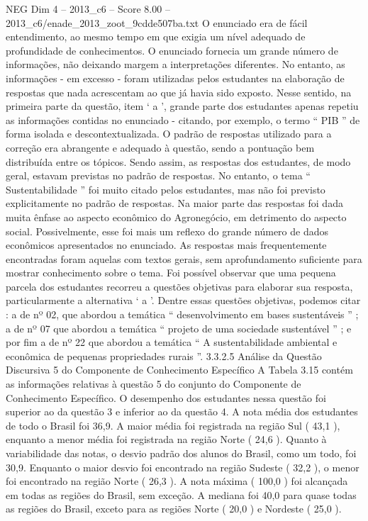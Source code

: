 \begin{textsample}{NEG Dim 4 – 2013\_c6 – Score 8.00 – 2013\_c6/enade\_2013\_zoot\_9cdde507ba.txt}
O enunciado era de fácil entendimento, ao mesmo tempo em que exigia um nível adequado de profundidade de conhecimentos.
O enunciado fornecia um grande número de informações, não deixando margem a interpretações diferentes.
No entanto, as informações - em excesso - foram utilizadas pelos estudantes na elaboração de respostas que nada acrescentam ao que já havia sido exposto.
Nesse sentido, na primeira parte da questão, item ‘ a ’, grande parte dos estudantes apenas repetiu as informações contidas no enunciado - citando, por exemplo, o termo “ PIB ” de forma isolada e descontextualizada.
O padrão de respostas utilizado para a correção era abrangente e adequado à questão, sendo a pontuação bem distribuída entre os tópicos.
Sendo assim, as respostas dos estudantes, de modo geral, estavam previstas no padrão de respostas.
No entanto, o tema “ Sustentabilidade ” foi muito citado pelos estudantes, mas não foi previsto explicitamente no padrão de respostas.
Na maior parte das respostas foi dada muita ênfase ao aspecto econômico do Agronegócio, em detrimento do aspecto social.
Possivelmente, esse foi mais um reflexo do grande número de dados econômicos apresentados no enunciado.
As respostas mais frequentemente encontradas foram aquelas com textos gerais, sem aprofundamento suficiente para mostrar conhecimento sobre o tema.
Foi possível observar que uma pequena parcela dos estudantes recorreu a questões objetivas para elaborar sua resposta, particularmente a alternativa ‘ a ’.
Dentre essas questões objetivas, podemos citar : a de nº 02, que abordou a temática “ desenvolvimento em bases sustentáveis ” ; a de nº 07 que abordou a temática “ projeto de uma sociedade sustentável ” ; e por fim a de nº 22 que abordou a temática “ A sustentabilidade ambiental e econômica de pequenas propriedades rurais ”. 3.3.2.5 Análise da Questão Discursiva 5 do Componente de Conhecimento Específico A Tabela 3.15 contém as informações relativas à questão 5 do conjunto do Componente de Conhecimento Específico.
O desempenho dos estudantes nessa questão foi superior ao da questão 3 e inferior ao da questão 4.
A nota média dos estudantes de todo o Brasil foi 36,9.
A maior média foi registrada na região Sul ( 43,1 ), enquanto a menor média foi registrada na região Norte ( 24,6 ).
Quanto à variabilidade das notas, o desvio padrão dos alunos do Brasil, como um todo, foi 30,9.
Enquanto o maior desvio foi encontrado na região Sudeste ( 32,2 ), o menor foi encontrado na região Norte ( 26,3 ).
A nota máxima ( 100,0 ) foi alcançada em todas as regiões do Brasil, sem exceção.
A mediana foi 40,0 para quase todas as regiões do Brasil, exceto para as regiões Norte ( 20,0 ) e Nordeste ( 25,0 ).

\end{textsample}

